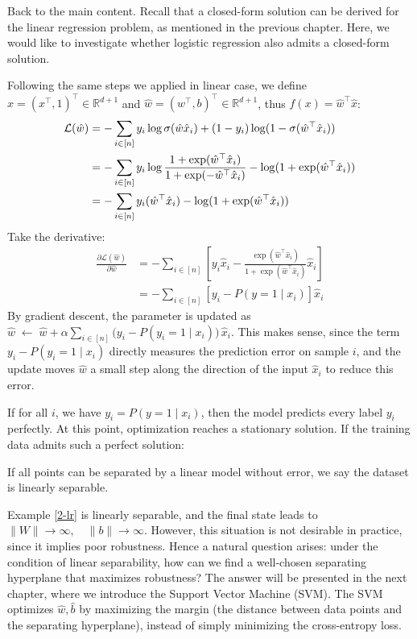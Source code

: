 \documentclass[../main]{subfiles}
\begin{document}
\vspace{1em}
Back to the main content. Recall that a closed-form solution can be derived for the linear regression problem, as mentioned in the previous chapter. Here, we would like to investigate whether logistic regression also admits a closed-form solution.

Following the same steps we applied in linear case, we define $\hat x=(x^\top,1)^\top\in\mathbb R^{d+1}$ and $\hat w=(w^\top,b)^{\top}\in\mathbb R^{d+1}$, thus $f(x)=\hat w^\top \hat x$:
\begin{align}
  \mathcal L(\hat w)&=-\sum_{i\in[n]}y_i\log\sigma(\hat w\hat x_i)+(1-y_i)\log(1-\sigma(\hat w^\top\hat x_i))\notag\\
  &=-\sum_{i\in[n]}y_i\log\frac{1+\exp(\hat w^\top\hat x_i)}{1+\exp(-\hat w^\top\hat x_i)}-\log(1+\exp(\hat w^\top\hat x_i))\notag\\
  &=-\sum_{i\in[n]}y_i(\hat w^\top\hat x_i)-\log(1+\exp(\hat w^\top\hat x_i))
\end{align}
Take the derivative:
\begin{align}
  \frac{\partial\mathcal L(\hat w)}{\partial \hat w}&=-\sum_{i\in[n]}\left[y_i\hat x_i-\frac{\exp(\hat w^\top\hat x_i)}{1+\exp(\hat w^\top\hat x_i)}\hat x_i\right]\\
  &=-\sum_{i\in [n]}\left[y_i-P(y=1\mid x_i)\right]\hat x_i
\end{align}
By gradient descent, the parameter is updated as $
  \hat w \;\leftarrow\; \hat w + \alpha \sum_{i \in [n]} \Big(y_i - P(y_i=1 \mid x_i)\Big)\,\hat x_i .$
This makes sense, since the term $y_i - P(y_i=1 \mid x_i)$ directly measures the prediction error on sample $i$, and the update moves $\hat w$ a small step along the direction of the input $\hat x_i$ to reduce this error.

If for all $i$, we have $y_i = P(y=1 \mid x_i)$, then the model predicts every label $y_i$ perfectly. At this point, optimization reaches a stationary solution. If the training data admits such a perfect solution:
\begin{definition}
  If all points can be separated by a linear model without error, we say the dataset is {linearly separable}.
\end{definition}

Example \ref{2-lr} is linearly separable, and the final state leads to $\|W\| \to \infty, \quad \|b\| \to \infty$. However, this situation is not desirable in practice, since it implies poor robustness. Hence a natural question arises: under the condition of linear separability, how can we find a well-chosen separating hyperplane that maximizes robustness? The answer will be presented in the next chapter, where we introduce the Support Vector Machine (SVM). The SVM optimizes $\hat w, \hat b$ by maximizing the margin (the distance between data points and the separating hyperplane), instead of simply minimizing the cross-entropy loss.
\end{document}
